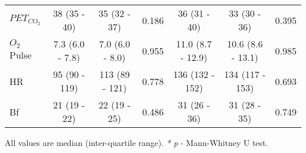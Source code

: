 \begin{sidewaystable}[p]
\begin{tabular}{|l | c c c | c c c|}
		$PET_{CO_2}$                 & 38 (35 - 40)       & 35 (32 - 37)       & 0.186 & 36 (31 - 40)       & 33 (30 - 36)       & 0.395 \\
		$O_2$Pulse                   & 7.3 (6.0 - 7.8)    & 7.0 (6.0 - 8.0)    & 0.955 & 11.0 (8.7 - 12.9)  & 10.6 (8.6 - 13.1)  & 0.985 \\
		HR                           & 95 (90 - 119)      & 113 (89 - 121)     & 0.778 & 136 (132 - 152)    & 134 (117 - 153)    & 0.693 \\
		Bf                           & 21 (19 - 22)       & 22 (19 - 25)       & 0.486 & 31 (26 - 36)       & 31 (28 - 35)       & 0.749 \\ \hline
	\end{tabular}
	
	All values are median (inter-quartile range). \textit{* p} - Mann-Whitney U test.
\end{sidewaystable}

